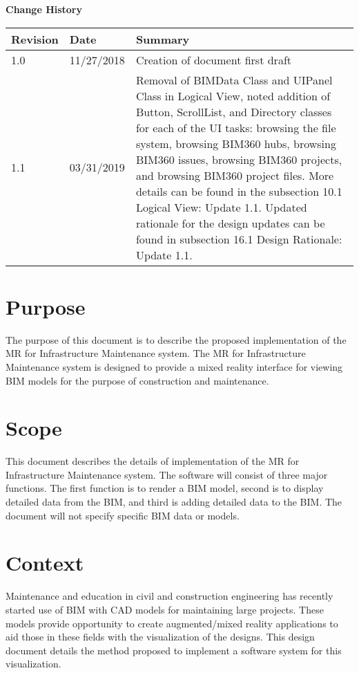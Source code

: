 \documentclass[onecolumn, draftclsnofoot,10pt, compsoc]{IEEEtran}
\begin{document}
\textbf{Change History}\par

\begin{tabular}{ p{2cm} p{4cm} p{} }
 \textbf{Revision} & \textbf{Date} & \textbf{Summary} \\
 \hline
 1.0 & 11/27/2018 & Creation of document first draft \\
 1.1 & 03/31/2019 & Removal of BIMData Class and UIPanel Class in Logical View, noted addition of Button, ScrollList, and Directory classes for each of the UI tasks: browsing the file system, browsing BIM360 hubs, browsing BIM360 issues, browsing BIM360 projects, and browsing BIM360 project files. More details can be found in the subsection 10.1 Logical View: Update 1.1. Updated rationale for the design updates can be found in subsection 16.1 Design Rationale: Update 1.1.
\end{tabular}

\tableofcontents
\listoffigures
\clearpage

\section{Purpose}
The purpose of this document is to describe the proposed implementation of the MR for Infrastructure Maintenance system.
The MR for Infrastructure Maintenance system is designed to provide a mixed reality interface for viewing BIM models for the purpose of construction and maintenance.
\par

\section{Scope}
This document describes the details of implementation of the MR for Infrastructure Maintenance system.
The software will consist of three major functions.
The first function is to render a BIM model, second is to display detailed data from the BIM, and third is adding detailed data to the BIM.
The document will not specify specific BIM data or models.\par

\section{Context}
Maintenance and education in civil and construction engineering has recently started use of BIM with CAD models for maintaining large projects.
These models provide opportunity to create augmented/mixed reality applications to aid those in these fields with the visualization of the designs.
This design document details the method proposed to implement a software system for this visualization.
\par
\end{document}
